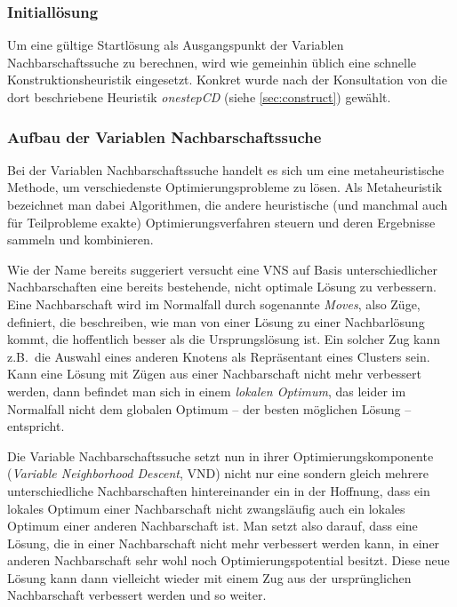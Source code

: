 \documentclass[paper=a4,fontsize=12pt]{scrartcl}
\begin{document}
\subsubsection{Initiallösung}
Um eine gültige Startlösung als Ausgangspunkt der Variablen Nachbarschaftssuche zu berechnen, wird wie gemeinhin üblich eine schnelle Konstruktionsheuristik eingesetzt. Konkret wurde nach der Konsultation von \citet*{Li2000} die dort beschriebene Heuristik \emph{onestepCD} (siehe \ref{sec:construct}) gewählt.

\subsubsection{Aufbau der Variablen Nachbarschaftssuche}
Bei der Variablen Nachbarschaftssuche handelt es sich um eine metaheuristische Methode, um verschiedenste Optimierungsprobleme zu lösen. Als Metaheuristik bezeichnet man dabei Algorithmen, die andere heuristische (und manchmal auch für Teilprobleme exakte) Optimierungsverfahren steuern und deren Ergebnisse sammeln und kombinieren.

Wie der Name bereits suggeriert versucht eine VNS auf Basis unterschiedlicher Nachbarschaften eine bereits bestehende, nicht optimale Lösung zu verbessern. Eine Nachbarschaft wird im Normalfall durch sogenannte \emph{Moves}, also Züge, definiert, die beschreiben, wie man von einer Lösung zu einer Nachbarlösung kommt, die hoffentlich besser als die Ursprungslösung ist. Ein solcher Zug kann z.B.\ die Auswahl eines anderen Knotens als Repräsentant eines Clusters sein. Kann eine Lösung mit Zügen aus einer Nachbarschaft nicht mehr verbessert werden, dann befindet man sich in einem \emph{lokalen Optimum}, das leider im Normalfall nicht dem globalen Optimum -- der besten möglichen Lösung -- entspricht.

Die Variable Nachbarschaftssuche setzt nun in ihrer Optimierungskomponente (\emph{Variable Neighborhood Descent}, VND) nicht nur eine sondern gleich mehrere unterschiedliche Nachbarschaften hintereinander ein in der Hoffnung, dass ein lokales Optimum einer Nachbarschaft nicht zwangsläufig auch ein lokales Optimum einer anderen Nachbarschaft ist. Man setzt also darauf, dass eine Lösung, die in einer Nachbarschaft nicht mehr verbessert werden kann, in einer anderen Nachbarschaft sehr wohl noch Optimierungspotential besitzt. Diese neue Lösung kann dann vielleicht wieder mit einem Zug aus der ursprünglichen Nachbarschaft verbessert werden und so weiter.
\end{document}
